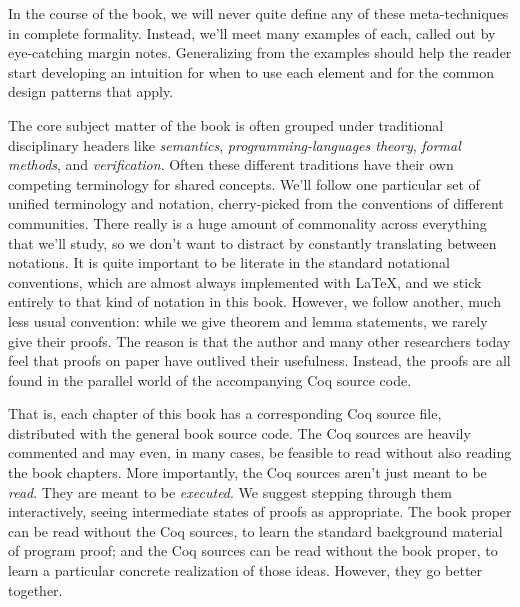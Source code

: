 \documentclass{amsbook}
\theoremstyle{definition}
\theoremstyle{remark}
\numberwithin{section}{chapter}
\numberwithin{equation}{chapter}
\begin{document}
\newcommand{\encoding}[0]{\marginpar{\fbox{\textbf{Encoding}}}}

In the course of the book, we will never quite define any of these meta-techniques in complete formality.
Instead, we'll meet many examples of each, called out by eye-catching margin notes.
Generalizing from the examples should help the reader start developing an intuition for when to use each element and for the common design patterns that apply.

The core subject matter of the book is often grouped under traditional disciplinary headers like \emph{semantics}, \emph{programming-languages theory}, \emph{formal methods}, and \emph{verification}.
Often these different traditions have their own competing terminology for shared concepts.
We'll follow one particular set of unified terminology and notation, cherry-picked from the conventions of different communities.
There really is a huge amount of commonality across everything that we'll study, so we don't want to distract by constantly translating between notations.
It is quite important to be literate in the standard notational conventions, which are almost always implemented with \index{\LaTeX{}}\LaTeX{}, and we stick entirely to that kind of notation in this book.
However, we follow another, much less usual convention: while we give theorem and lemma statements, we rarely give their proofs.
The reason is that the author and many other researchers today feel that proofs on paper have outlived their usefulness.
Instead, the proofs are all found in the parallel world of the accompanying Coq source code.

That is, each chapter of this book has a corresponding Coq source file, distributed with the general book source code.
The Coq sources are heavily commented and may even, in many cases, be feasible to read without also reading the book chapters.
More importantly, the Coq sources aren't just meant to be \emph{read}.
They are meant to be \emph{executed}.
We suggest stepping through them interactively, seeing intermediate states of proofs as appropriate.
The book proper can be read without the Coq sources, to learn the standard background material of program proof; and the Coq sources can be read without the book proper, to learn a particular concrete realization of those ideas.
However, they go better together.


\end{document}

